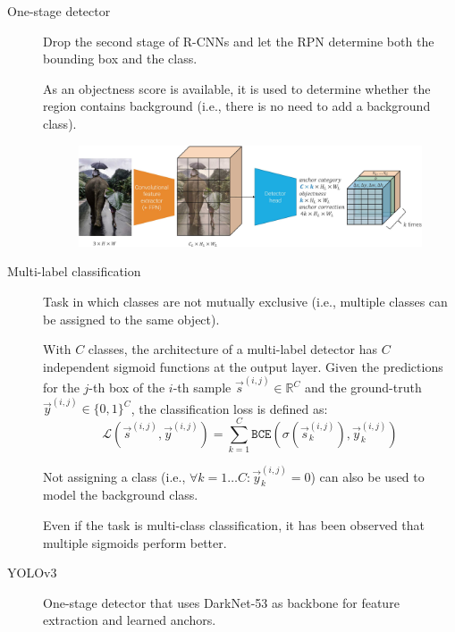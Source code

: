 \begin{description}
    \item[One-stage detector] 
        Drop the second stage of R-CNNs and let the RPN determine both the bounding box and the class.

        As an objectness score is available, it is used to determine whether the region contains background (i.e., there is no need to add a background class).

        \begin{figure}[H]
            \centering
            \includegraphics[width=0.95\linewidth]{./img/_one_stage_detector.jpg}
        \end{figure}

    \item[Multi-label classification] 
        Task in which classes are not mutually exclusive (i.e., multiple classes can be assigned to the same object).

        With $C$ classes, the architecture of a multi-label detector has $C$ independent sigmoid functions at the output layer. Given the predictions for the $j$-th box of the $i$-th sample $\vec{s}^{(i, j)} \in \mathbb{R}^{C}$ and the ground-truth $\vec{y}^{(i, j)} \in \{0, 1\}^{C}$, the classification loss is defined as:
        \[ 
            \mathcal{L}(\vec{s}^{(i, j)}, \vec{y}^{(i, j)}) = \sum_{k=1}^{C} \texttt{BCE}\left( \sigma(\vec{s}_k^{(i, j)}), \vec{y}_k^{(i, j)} \right)
        \]

        \begin{remark}
            Not assigning a class (i.e., $\forall k = 1 \dots C: \vec{y}_k^{(i, j)} = 0$) can also be used to model the background class.
        \end{remark}

        \begin{remark}
            Even if the task is multi-class classification, it has been observed that multiple sigmoids perform better.
        \end{remark}

    \item[YOLOv3] 
        One-stage detector that uses DarkNet-53 as backbone for feature extraction and learned anchors.


\end{description}
